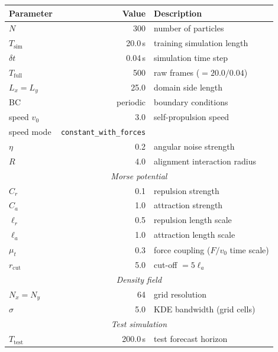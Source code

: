 \documentclass[11pt, letterpaper]{article}
\theoremstyle{definition}
\begin{document}
\begin{center}
\renewcommand{\arraystretch}{1.25}
\begin{tabular}{lrl}
  \toprule
  \textbf{Parameter} & \textbf{Value} & \textbf{Description} \\
  \midrule
  $N$            & 300          & number of particles \\
  $T_{\mathrm{sim}}$ & 20.0\,s & training simulation length \\
  $\delta t$     & 0.04\,s      & simulation time step \\
  $T_{\mathrm{full}}$ & 500    & raw frames ($= 20.0 / 0.04$) \\
  $L_x = L_y$   & 25.0         & domain side length \\
  BC             & periodic     & boundary conditions \\
  speed $v_0$    & 3.0          & self-propulsion speed \\
  speed mode     & \texttt{constant\_with\_forces} & \\
  $\eta$         & 0.2          & angular noise strength \\
  $R$            & 4.0          & alignment interaction radius \\
  \midrule
  \multicolumn{3}{c}{\textit{Morse potential}} \\
  $C_r$          & 0.1          & repulsion strength \\
  $C_a$          & 1.0          & attraction strength \\
  $\ell_r$       & 0.5          & repulsion length scale \\
  $\ell_a$       & 1.0          & attraction length scale \\
  $\mu_t$        & 0.3          & force coupling ($F/v_0$ time scale) \\
  $r_{\mathrm{cut}}$ & 5.0      & cut-off $= 5 \ell_a$ \\
  \midrule
  \multicolumn{3}{c}{\textit{Density field}} \\
  $N_x = N_y$    & 64           & grid resolution \\
  $\sigma$        & 5.0          & KDE bandwidth (grid cells) \\
  \midrule
  \multicolumn{3}{c}{\textit{Test simulation}} \\
  $T_{\mathrm{test}}$ & 200.0\,s & test forecast horizon \\
  \bottomrule
\end{tabular}
\end{center}
\end{document}
